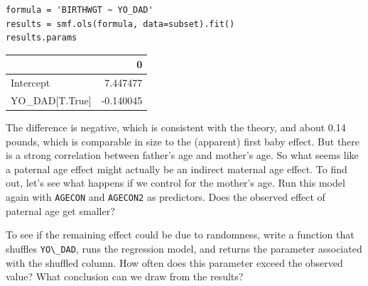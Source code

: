 \begin{lstlisting}[]
formula = 'BIRTHWGT ~ YO_DAD'
results = smf.ols(formula, data=subset).fit()
results.params
\end{lstlisting}

\begin{tabular}{lr}
\midrule
{} &         0 \\
\midrule
Intercept      &  7.447477 \\
YO\_DAD[T.True] & -0.140045 \\
\midrule
\end{tabular}

The difference is negative, which is consistent with the theory, and
about 0.14 pounds, which is comparable in size to the (apparent) first
baby effect. But there is a strong correlation between father's age and
mother's age. So what seems like a paternal age effect might actually be
an indirect maternal age effect. To find out, let's see what happens if
we control for the mother's age. Run this model again with
\passthrough{\lstinline!AGECON!} and \passthrough{\lstinline!AGECON2!}
as predictors. Does the observed effect of paternal age get smaller?

To see if the remaining effect could be due to randomness, write a
function that shuffles \passthrough{\lstinline!YO\_DAD!}, runs the
regression model, and returns the parameter associated with the shuffled
column. How often does this parameter exceed the observed value? What
conclusion can we draw from the results?

